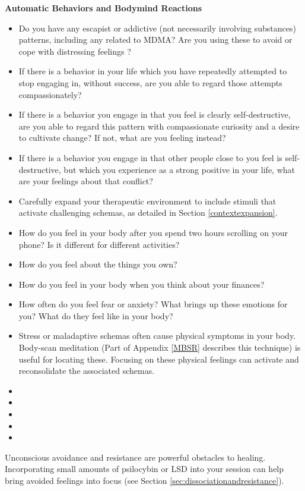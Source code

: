 \documentclass[12pt,letterpaper]{article}
\begin{document}
\noindent \textbf{Automatic Behaviors and Bodymind Reactions}
\begin{itemize}
    \item Do you have any escapist or addictive (not necessarily involving substances) patterns, including any related to MDMA? Are you using these to avoid or cope with distressing feelings \cite{forsterTraumaAddiction,alaviBehavioralAddiction}?
    \item If there is a behavior in your life which you have repeatedly attempted to stop engaging in, without success, are you able to regard those attempts compassionately?
    \item If there is a behavior you engage in that you feel is clearly self-destructive, are you able to regard this pattern with compassionate curiosity and a desire to cultivate change? If not, what are you feeling instead?
    \item If there is a behavior you engage in that other people close to you feel is self-destructive, but which you experience as a strong positive in your life, what are your feelings about that conflict?
    \item Carefully expand your therapeutic environment to include stimuli that activate challenging schemas, as detailed in Section \ref{contextexpansion}.
    \item How do you feel in your body after you spend two hours scrolling on your phone? Is it different for different activities?
    \item How do you feel about the things you own?
    \item How do you feel in your body when you think about your finances?
    \item How often do you feel fear or anxiety? What brings up these emotions for you? What do they feel like in your body?
    \item Stress or maladaptive schemas often cause physical symptoms in your body. Body-scan meditation (Part of Appendix \ref{MBSR} describes this technique) is useful for locating these. Focusing on these physical feelings can activate and reconsolidate the associated schemas.
\end{itemize}

\begin{itemize}
    \item {}
    \item {}
    \item {}
    \item {}
    \item {}
\end{itemize}
Unconscious avoidance and resistance are powerful obstacles to healing. Incorporating small amounts of psilocybin or LSD into your session can help bring avoided feelings into focus (see Section \ref{sec:dissociationandresistance}). 
\end{document}
